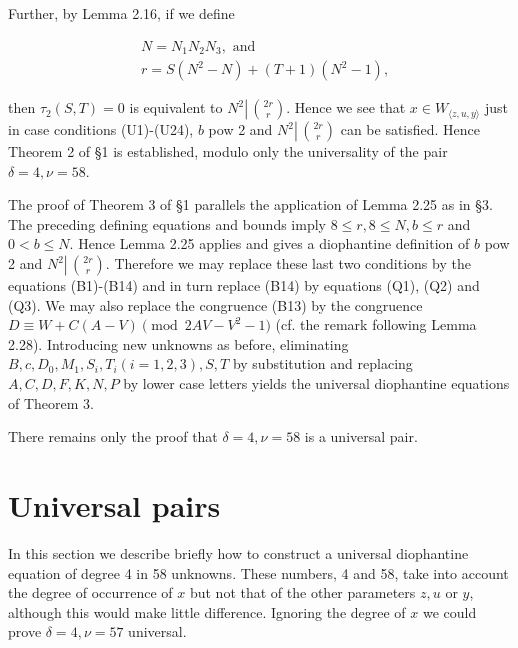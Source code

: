 \documentclass[11pt,a4paper]{article}
\newcommand{\origpage}[1]{\marginnote{\footnotesize\textbf{[#1]}}}
\begin{document}
Further, by Lemma 2.16, if we define


\begin{align*}
& N=N_{1} N_{2} N_{3}, \text { and }  \tag{U23}\\
& r=S\left(N^{2}-N\right)+(T+1)\left(N^{2}-1\right), \tag{U24}
\end{align*}


then $\tau_{2}(S,\allowbreak  T)=0$ is equivalent to $N^{2} \left\lvert\,\allowbreak \binom{ 2 r}{r}\right.$. Hence we see that $x \in W_{\langle z, u, y\rangle}$ just in case conditions (U1)-(U24), $b$ pow 2 and $N^{2} \left\lvert\,\allowbreak \binom{ 2 r}{r}\right.$ can be satisfied. Hence Theorem 2 of §1 is established, modulo only the universality of the pair $\delta=4,\allowbreak  \nu=58$.

The proof of Theorem 3 of §1 parallels the application of Lemma 2.25 as in §3. The preceding defining equations and bounds imply $8 \leq r,\allowbreak  8 \leq N,\allowbreak  b \leq r$ and $0<b \leq N$. Hence Lemma 2.25 applies and gives a diophantine definition of $b$ pow 2 and $N^{2} \left\lvert\,\allowbreak \binom{ 2 r}{r}\right.$. Therefore we may replace these last two conditions by the equations (B1)-(B14) and in turn replace (B14) by equations (Q1), (Q2) and (Q3). We may also replace the congruence (B13) by the congruence $D\equiv W+C(A-V)\pmod{2AV-V^{2}-1}$ (cf. the remark following Lemma 2.28). Introducing new unknowns as before, eliminating $B,\allowbreak  c,\allowbreak  D_{0},\allowbreak  M_{1},\allowbreak  S_{i},\allowbreak  T_{i}(i=1,\allowbreak 2,\allowbreak 3),\allowbreak  S,\allowbreak  T$ by substitution and replacing $A,\allowbreak  C,\allowbreak  D,\allowbreak  F,\allowbreak  K,\allowbreak  N,\allowbreak  P$ by lower case letters yields the universal diophantine equations of Theorem 3.

There remains only the proof that $\delta=4,\allowbreak  \nu=58$ is a universal pair.

\section{Universal pairs} In this section we describe briefly how to construct a universal diophantine equation of degree 4 in 58 unknowns. These numbers, 4 and 58, \origpage{568}take into account the degree of occurrence of $x$ but not that of the other parameters $z,\allowbreak  u$ or $y$, although this would make little difference. Ignoring the degree of $x$ we could prove $\delta=4,\allowbreak  \nu=57$ universal.
\end{document}
